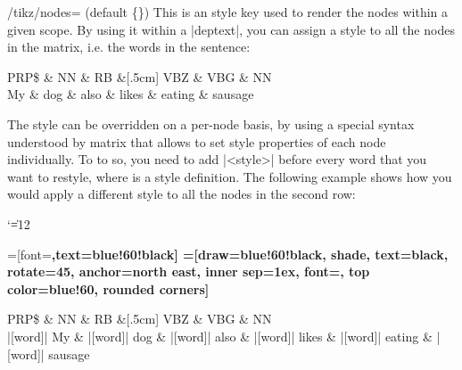 \documentclass[a4paper]{ltxdoc}
\newcommand{\pipeescape}{\catcode`\|=12}
\newcommand{\cmdname}[1]{\texttt{\color{red!75!black}\detokenize{#1}}}
\begin{document}
\begin{stylekey}{/tikz/nodes= (default \{\})}
      This is an \tikzname{} style key used to render the nodes within a given scope. By using it within a |deptext|, you can assign a style to all the nodes in the matrix, i.e. the words in the sentence:
\begin{codeexample}[]
\begin{dependency}[edge style={green!60!black,very thick}, 
      label style={fill=blue!60,font=\bfseries,text=white}]
   \begin{deptext}[column sep=.5cm, row sep=.1ex,
         nodes={draw=red!80!black, shade, top color=red!60, rounded corners}]
      PRP\$ \& NN \& RB \&[.5cm] VBZ \& VBG \& NN \\
      My \& dog \& also \& likes \& eating \& sausage \\
   \end{deptext}
\end{dependency}
\end{codeexample}
The style can be overridden on a per-node basis, by using a special syntax understood by matrix that allows to set style properties of each node individually. To to so, you need to add \cmdname{|[}|<style>|\cmdname{]|} before every word that you want to restyle, where  is a style definition. The following example shows how you would apply a different style to all the nodes in the second row:
{\pipeescape
\begin{codeexample}[]
\begin{dependency}[edge style={green!60!black,very thick}, 
   label style={fill=blue!60,font=\bfseries,text=white}]
   =[font=\footnotesize\bfseries,text=blue!60!black]
   =[draw=blue!60!black, shade, text=black,
                     rotate=45, anchor=north east, inner sep=1ex,
                     font=\normalsize, top color=blue!60, rounded corners]
   \begin{deptext}[column sep=.5cm, row sep=0, nodes={POS}]
       PRP\$ \&  NN \&  RB \&[.5cm] VBZ \&  VBG \&  NN \\
       |[word]| My \& |[word]| dog \& |[word]| also \& 
       |[word]| likes \& |[word]| eating \& |[word]| sausage \\
   \end{deptext}

\end{dependency}
\end{codeexample}}
\end{stylekey}
\end{document}
